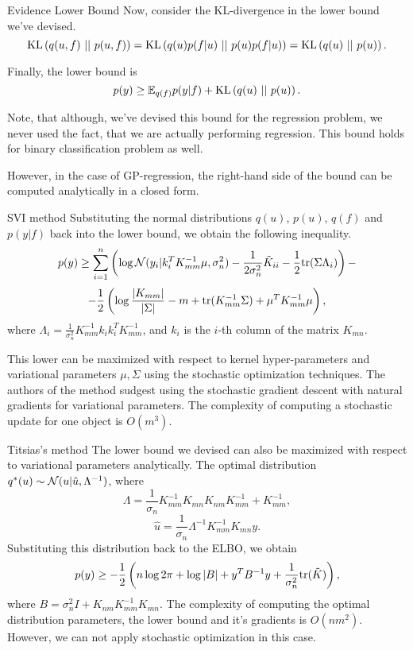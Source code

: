 		\begin{frame}{Evidence Lower Bound}
			Now, consider the KL-divergence in the lower bound we've devised.
			$$\mbox{KL}\left(q(u, f)\mbox{ || }p(u, f)\right) = \mbox{KL}\left(q(u) p(f|u)\mbox{ || }p(u) p(f|u)\right) = \mbox{KL}\left(q(u)\mbox{ || }p(u)\right).$$

			Finally, the lower bound is
			$$p(y) \ge \mathbb{E}_{q(f)} p(y | f) + \mbox{KL}\left(q(u)\mbox{ || }p(u)\right).$$

			Note, that although, we've devised this bound for the regression problem, we never used the fact, that we are actually performing regression. This bound holds for binary classification problem as well.

			However, in the case of GP-regression, the right-hand side of the bound can be computed analytically in a closed form.
		\end{frame}

		\begin{frame}{SVI method}
			Substituting the normal distributions $q(u)$, $p(u)$, $q(f)$ and $p(y|f)$ back into the lower bound, we obtain the following inequality.
			$$p(y) \ge \sum_{i = 1}^{n} \left( \log \mathcal{N}(y_i | k_i^T K_{mm}^{-1} \mu, \sigma_n^2) - \frac 1 {2 \sigma_n^2} \tilde K_{ii} - \frac 1 2 \mbox{tr} (\Sigma \Lambda_i) \right) - $$
			$$ -\frac 1 2 \left (\log \frac {|K_{mm}|} {|\Sigma|} - m + \mbox{tr}(K_{mm}^{-1} \Sigma) + \mu^T K_{mm}^{-1} \mu \right),$$
			where $\Lambda_i = \frac 1 {\sigma_n^2} K_{mm}^{-1} k_i k_i^T K_{mm}^{-1}$, and $k_i$ is the $i$-th column of the matrix $K_{mn}$.

			This lower can be maximized with respect to kernel hyper-parameters and variational parameters $\mu, \Sigma$ using the stochastic optimization techniques. The authors of the method sudgest using the stochastic gradient descent with natural gradients for variational parameters. The complexity of computing a stochastic update for one object is $O(m^3)$.
		\end{frame}

		\begin{frame}{Titsias's method}
			The lower bound we devised can also be maximized with respect to variational parameters analytically. The optimal distribution $q^*(u) \sim \mathcal{N}(u|\hat u, \Lambda^{-1})$, where
			$$\Lambda = \frac 1 {\sigma_n} K_{mm}^{-1} K_{mn} K_{nm} K_{mm}^{-1} + K_{mm}^{-1},$$
			$$\hat u = \frac 1 {\sigma_n} \Lambda^{-1} K_{mm}^{-1} K_{mn} y.$$
			Substituting this distribution back to the ELBO, we obtain
			$$p(y) \ge -\frac 1 2 \left(n \log 2\pi + \log |B| + y^T B^{-1} y + \frac 1 {\sigma_n^2} \mbox{tr}(\tilde K)\right),$$
			where $B = \sigma_n^2 I + K_{nm} K_{mm}^{-1} K_{mn}$. The complexity of computing the optimal distribution parameters, the lower bound and it's gradients is $O(n m^2)$. However, we can not apply stochastic optimization in this case.
		\end{frame}

